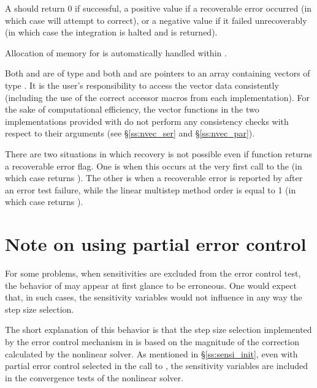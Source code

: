 {
  A  should return 0 if successful, a positive value if a recoverable
  error occurred (in which case {\idas} will attempt to correct), or a negative 
  value if it failed unrecoverably (in which case the integration is halted and
   is returned).
}
{
  Allocation of memory for  is automatically handled within {\idas}.

  Both  and  are of type  and both  and 
  are pointers to an array containing  vectors of type .
  It is the user's responsibility to access the vector data consistently 
  (including the use of the correct accessor macros from each {\nvector} implementation). 
  For the sake of computational efficiency, the vector functions in the two {\nvector} 
  implementations provided with {\idas} do not perform any consistency checks with respect 
  to their  arguments (see \S\ref{ss:nvec_ser} and \S\ref{ss:nvec_par}).

  There are two situations in which recovery is not possible even if
   function returns a recoverable error flag.  One is when
  this occurs at the very first call to the  (in which case
  {\idas} returns ).  The other is when a recoverable
  error is reported by  after an error test failure, while the
  linear multistep method order is equal to 1 (in which case {\idas} returns
  ).
}


\section{Note on using partial error control}\label{ss:partial}
For some problems, when sensitivities are excluded from the error control test, 
the behavior of {\idas} may appear at first glance to be erroneous. One would
expect that, in such cases, the sensitivity variables would not influence in
any way the step size selection.

The short explanation of this behavior is that the step size selection
implemented by the error control mechanism in {\idas} is based on the 
magnitude of the correction calculated by the nonlinear solver. As mentioned
in \S\ref{ss:sensi_init}, even with partial error control selected
in the call to , the sensitivity variables are included
in the convergence tests of the nonlinear solver.

